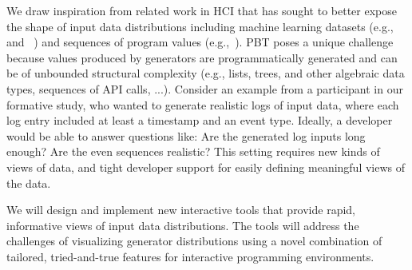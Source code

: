 We draw inspiration from related work in HCI that has sought to better expose
the shape of input data distributions including
machine learning datasets
(e.g.,~\cite{ref:hohman2019gamut} and
~\cite{ref:hohman2020understanding}) and sequences of program values
(e.g.,~\cite{ref:kang2017omnicode}).
PBT poses a unique challenge because values produced by generators are
programmatically generated and
can be of unbounded structural
complexity (e.g., lists, trees, and other algebraic data types,
sequences of API calls, ...).
Consider an
example from a participant in our formative study, who wanted to generate
realistic logs of input data, where each log entry included at least a timestamp
and an event type. Ideally, a developer would be able to answer
questions like: Are the generated log inputs long enough? Are the even sequences
realistic? This setting requires new kinds of views of data, and tight
developer support for easily defining meaningful views of the data.

We will design and implement new interactive tools that provide rapid,
informative views of input data distributions. The tools will address the
challenges of visualizing generator distributions using a novel combination of
tailored, tried-and-true features for interactive programming environments.

